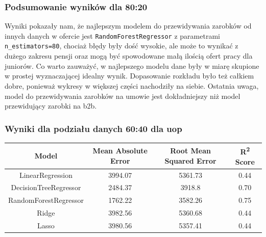 \documentclass[a4paper]{article}
\begin{document}
\subsubsection{Podsumowanie wyników dla 80:20}

\quad Wyniki pokazały nam, że najlepszym modelem do przewidywania zarobków od innych danych w ofercie jest \texttt{RandomForestRegressor} z parametrami \texttt{n\_estimators=80},
chociaż błędy były dość wysokie, ale może to wynikać z dużego zakresu pensji oraz mogą być spowodowane małą ilością ofert pracy dla juniorów. Co warto zauważyć,
w najlepszego modelu dane były w miarę skupione w prostej wyznaczającej idealny wynik. Dopasowanie rozkładu było też całkiem dobre, ponieważ
wykresy w większej części nachodziły na siebie. Ostatnia uwaga, model do przewidywania zarobków na umowie jest dokładniejszy niż model przewidujący zarobki na b2b.


\subsubsection{Wyniki dla podziału danych 60:40 dla uop}

\begin{table}[H]
    \centering
    \begin{tabular}{|c|c|c|c|}
        \hline
        \textbf{Model}        & \textbf{Mean Absolute Error} & \textbf{Root Mean Squared Error} & \textbf{R\textsuperscript{2} Score} \\ \hline
        LinearRegression      & 3994.07                      & 5361.73                          & 0.44                                \\ \hline
        DecisionTreeRegressor & 2484.37                      & 3918.8                           & 0.70                                \\ \hline
        RandomForestRegressor & 1762.22                      & 3582.26                          & 0.75                                \\ \hline
        Ridge                 & 3982.56                      & 5360.68                          & 0.44                                \\ \hline
        Lasso                 & 3980.56                      & 5357.41                          & 0.44                                \\ \hline
    \end{tabular}
\end{table}
\end{document}
